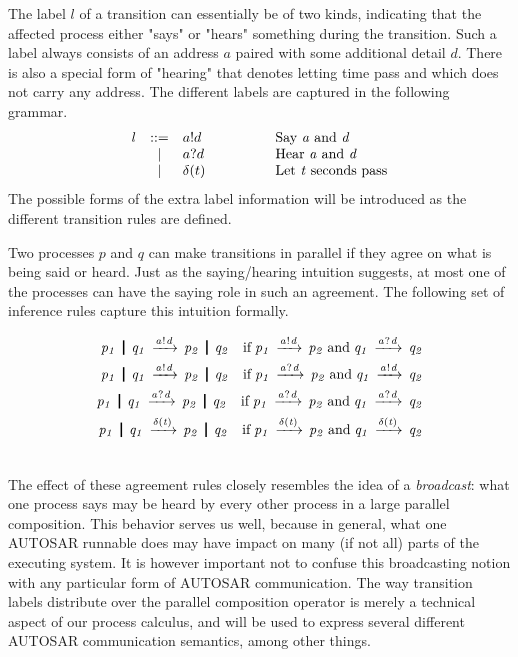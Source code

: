 \documentclass[twocolumn]{article}
\begin{document}
The label $l$ of a transition can essentially be of two kinds, indicating that the affected process either "says" or "hears" something during the transition. Such a label always consists of an address $a$ paired with some additional detail $d$. There is also a special form of "hearing" that denotes letting time pass and which does not carry any address. The different labels are captured in the following grammar. 
\[
\begin{array}{rcll}
  l         & ::= & a!d 	    & \hspace{4em}\text{Say  \V{A} and \V{D}} \\
            & |   & a?d 	    & \hspace{4em}\text{Hear \V{A} and \V{D}} \\
            & |   & \Tdelta t	& \hspace{4em}\text{Let \V{T} seconds pass} \\
\end{array}
\]
The possible forms of the extra label information  will be introduced as the different transition rules are defined.

Two processes $p$ and $q$ can make transitions in parallel if they agree on what is being said or heard. Just as the saying/hearing intuition suggests, at most one of the processes can have the saying role in such an agreement. The following set of inference rules capture this intuition formally.
{
\renewcommand{\Prule}[2]{#1 \quad \Pif\; #2\\}
\renewcommand{\Tstep}[3]{#1 \red{#2} #3}
\renewcommand\Pcomma{\;\text{and}\;}

\begin{eqnarray}  \CombRed  \notag \end{eqnarray}
}


The effect of these agreement rules closely resembles the idea of a \emph{broadcast}: what one process says may be heard by every other process in a large parallel composition. This behavior serves us well, because in general, what one AUTOSAR runnable does may have impact on many (if not all) parts of the executing system. It is however important not to confuse this broadcasting notion with any particular form of AUTOSAR communication. The way transition labels distribute over the parallel composition operator is merely a technical aspect of our process calculus, and will be used to express several different AUTOSAR communication semantics, among other things.
\end{document}
